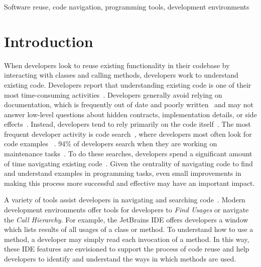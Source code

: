 \documentclass[conference]{IEEEtran}
\begin{document}
\begin{IEEEkeywords}
Software reuse, code navigation, programming tools, development environments
\end{IEEEkeywords}


\section{Introduction}

When developers look to reuse existing functionality in their codebase by interacting with classes and calling methods, developers work to understand existing code. Developers report that understanding existing code is one of their most time-consuming activities~\cite{latoza2006maintaining}. Developers generally avoid relying on documentation, which is frequently out of date and poorly written~\cite{documentation} and may not answer low-level questions about hidden contracts, implementation details, or side effects~\cite{head2018not}. Instead, developers tend to rely primarily on the code itself~\cite{head2018not, latoza2006maintaining}. The most frequent developer activity is code search~\cite{singer2010examination}, where developers most often look for code examples ~\cite{sadowski2015developers}. 
94\% of developers search when they are working on maintenance tasks~\cite{lawrance2008using}. To do these searches, developers spend a significant amount of time navigating existing code~\cite{piorkowski2016foraging,ko2006exploratory}. Given the centrality of navigating code to find and understand examples in programming tasks, even small improvements in making this process more successful and effective may have an important impact. 



A variety of tools assist developers in navigating and searching code~\cite{augustine2015field,ko2006exploratory,albusays2017interviews}. Modern development environments offer tools for developers to \textit{Find Usages} or navigate the \textit{Call Hierarchy}. For example, the JetBrains IDE offers developers a window which lists results of all usages of a class or method. To understand how to use a method, a developer may simply read each invocation of a method. In this way, these IDE features are envisioned to support the process of code reuse and help developers to identify and understand the ways in which methods are used.
\end{document}
